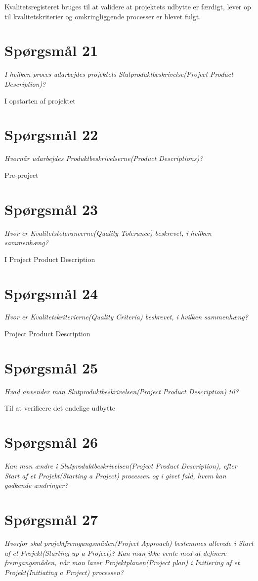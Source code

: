 Kvalitetsregisteret bruges til at validere at projektets udbytte er færdigt, lever op til kvalitetskriterier og omkringliggende processer er blevet fulgt.

\section{Spørgsmål 21}
\textit{I hvilken proces udarbejdes projektets Slutproduktbeskrivelse(Project Product Description)?}

I opstarten af projektet

\section{Spørgsmål 22}
\textit{Hvornår udarbejdes Produktbeskrivelserne(Product Descriptions)?}

Pre-project

\section{Spørgsmål 23}
\textit{Hvor er Kvalitetstolerancerne(Quality Tolerance) beskrevet, i hvilken sammenhæng?}

I Project Product Description

\section{Spørgsmål 24}
\textit{Hvor er Kvalitetskriterierne(Quality Criteria) beskrevet, i hvilken sammenhæng?}

Project Product Description

\section{Spørgsmål 25}
\textit{Hvad anvender man Slutproduktbeskrivelsen(Project Product Description) til?}

Til at verificere det endelige udbytte

\section{Spørgsmål 26}
\textit{Kan man ændre i Slutproduktbeskrivelsen(Project Product Description), efter Start af et Projekt(Starting a Project) processen og i givet fald, hvem kan godkende ændringer?}

\section{Spørgsmål 27}
\textit{Hvorfor skal projektfremgangsmåden(Project Approach) bestemmes allerede i Start af et Projekt(Starting up a Project)? Kan man ikke vente med at definere fremgangsmåden, når man laver Projektplanen(Project plan) i Initiering af et Projekt(Initiating a Project) processen?}

